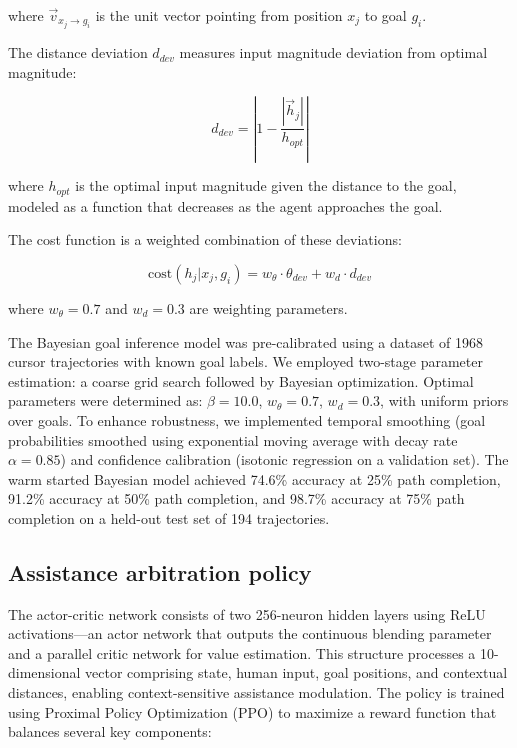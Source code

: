 \documentclass[11pt]{article}
\begin{document}
where $\vec{v}_{x_j\rightarrow g_i}$ is the unit vector pointing from position $x_j$ to goal $g_i$.

The distance deviation $d_{dev}$ measures input magnitude deviation from optimal magnitude:

\begin{equation}
d_{dev} = \left|1 - \frac{|\vec{h}_j|}{h_{opt}}\right|
\end{equation}

where $h_{opt}$ is the optimal input magnitude given the distance to the goal, modeled as a function that decreases as the agent approaches the goal.

The cost function is a weighted combination of these deviations:

\begin{equation}
\text{cost}(h_j|x_j,g_i) = w_\theta \cdot \theta_{dev} + w_d \cdot d_{dev}
\end{equation}

where $w_\theta = 0.7$ and $w_d = 0.3$ are weighting parameters.

The Bayesian goal inference model was pre-calibrated using a dataset of 1968 cursor trajectories with known goal labels. We employed two-stage parameter estimation: a coarse grid search followed by Bayesian optimization. Optimal parameters were determined as: $\beta = 10.0$, $w_\theta = 0.7$, $w_d = 0.3$, with uniform priors over goals. To enhance robustness, we implemented temporal smoothing (goal probabilities smoothed using exponential moving average with decay rate $\alpha = 0.85$) and confidence calibration (isotonic regression on a validation set).
The warm started Bayesian model achieved 74.6\% accuracy at 25\% path completion, 91.2\% accuracy at 50\% path completion, and 98.7\% accuracy at 75\% path completion on a held-out test set of 194 trajectories.

\subsection{Assistance arbitration policy}
The actor-critic network consists of two 256-neuron hidden layers using ReLU activations—an actor network that outputs the continuous blending parameter and a parallel critic network for value estimation. This structure processes a 10-dimensional vector comprising state, human input, goal positions, and contextual distances, enabling context-sensitive assistance modulation. The policy is trained using Proximal Policy Optimization (PPO) \cite{schulman2017proximal} to maximize a reward function that balances several key components:
\end{document}

